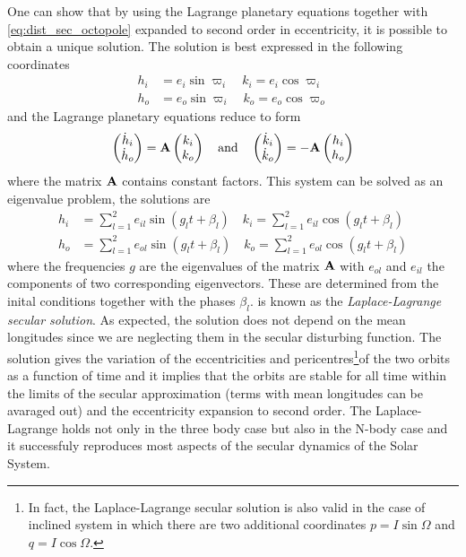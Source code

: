 One can show \citep{murray} that by using the Lagrange planetary 
equations together with \cref{eq:dist_sec_octopole} expanded
to second order in eccentricity, it is possible to obtain
a unique solution. The solution is best expressed in the 
following coordinates
\begin{align}
    h_i&=e_i\sin\varpi_i\quad k_i=e_i\cos\varpi_i\\
    h_o&=e_o\sin\varpi_i\quad k_o=e_o\cos\varpi_o
\end{align}
and the Lagrange planetary equations reduce to form
\begin{equation}
    \begin{pmatrix}
        \dot{h}_i\\
        \dot{h}_o
    \end{pmatrix}
    = \boldsymbol{\mathbf{A}}\begin{pmatrix}
        k_i\\
        k_o
    \end{pmatrix}
\quad    \text{and} \quad
\begin{pmatrix}
        \dot{k}_i\\
        \dot{k}_o
    \end{pmatrix}
    = -\boldsymbol{\mathbf{A}}\begin{pmatrix}
        h_i\\
        h_o
    \end{pmatrix}
\end{equation}
where the matrix $\boldsymbol{\mathbf{A}}$ contains constant factors. This
system can be solved as an eigenvalue problem, the solutions are
\begin{equation}
\begin{aligned}
    h_i&=\sum^2_{l=1}e_{il}\sin(g_lt+\beta_l)\quad
    k_i=\sum^2_{l=1}e_{il}\cos(g_lt+\beta_l)\\
    h_o&=\sum^2_{l=1}e_{ol}\sin(g_lt+\beta_l)\quad
    k_o=\sum^2_{l=1}e_{ol}\cos(g_lt+\beta_l)
\end{aligned}
    \label{eq:laplace_lagrange}
\end{equation}
where the frequencies $g$ are the eigenvalues of the matrix $\boldsymbol{\mathbf{A}}$
with $e_{ol}$ and $e_{il}$ the components of two corresponding 
eigenvectors. These are determined from the inital conditions together
with the phases $\beta_l$.  is known as
the \emph{Laplace-Lagrange secular solution}. As expected, the solution
does not depend on the mean longitudes since we are neglecting them
in the secular disturbing function. The solution gives the variation
of the eccentricities and pericentres\footnote{In fact, the 
Laplace-Lagrange secular solution is also valid in the case of inclined
system in which there are two additional coordinates $p=I\sin\Omega$
and $q=I\cos\Omega$.}of the two orbits as a function
of time and it implies that the orbits are stable for all time within
the limits of the secular approximation (terms with mean longitudes
can be avaraged out) and the eccentricity expansion to second order.
The Laplace-Lagrange holds not only in the three body case but
also in the N-body case and it successfuly reproduces most aspects
of the secular dynamics of the Solar System.
